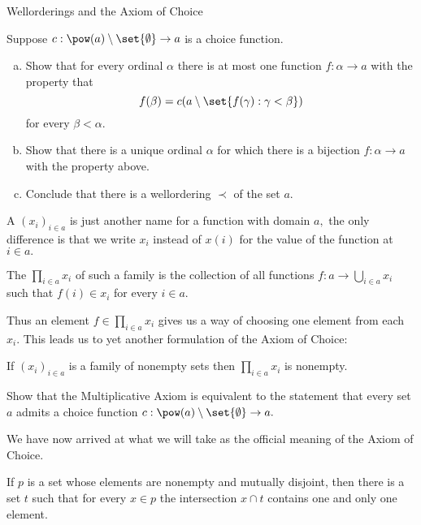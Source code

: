 \begin{unit}{Wellorderings and the Axiom of Choice}
\begin{problem}
  Suppose \(c:\pow(a)\setminus\set{\emptyset}\to a\) is a choice function.
  \begin{enumerate}[(a)]
  \item Show that for every ordinal \(\alpha\) there is at most one function \(f:\alpha \to a\) with the property that \[f(\beta) = c(a \setminus \set{f(\gamma) : \gamma < \beta})\] for every \(\beta < \alpha.\)
  \item Show that there is a unique ordinal \(\alpha\) for which there is a bijection \(f:\alpha \to a\) with the property above.
  \item Conclude that there is a wellordering \({\prec}\) of the set \(a.\)
  \end{enumerate}
\end{problem}

A  \((x_i)_{i \in a}\) is just another name for a function with domain \(a,\) the only difference is that we write \(x_i\) instead of \(x(i)\) for the value of the function at \(i \in a.\)

\begin{definition}\label{D:Product}
  The  \(\prod_{i \in a} x_i\) of such a family is the collection of all functions \(f:a \to \bigcup_{i \in a} x_i\) such that \(f(i) \in x_i\) for every \(i \in a.\)
\end{definition}

\noindent
Thus an element \(f \in \prod_{i \in a} x_i\) gives us a way of choosing one element from each \(x_i.\)
This leads us to yet another formulation of the Axiom of Choice:

\begin{theorem}\label{T:MultAx}
  If \((x_i)_{i \in a}\) is a family of nonempty sets then \(\prod_{i \in a} x_i\) is nonempty.
\end{theorem}

\begin{problem}
  Show that the Multiplicative Axiom is equivalent to the statement that every set \(a\) admits a choice function \(c:\pow(a)\setminus\set{\emptyset}\to a.\)
\end{problem}

We have now arrived at what we will take as the official meaning of the Axiom of Choice.

\begin{axiom}\label{A:Choice}
  If \(p\) is a set whose elements are nonempty and mutually disjoint, then there is a set \(t\) such that for every \(x \in p\) the intersection \(x \cap t\) contains one and only one element.
\end{axiom}


\end{unit}
